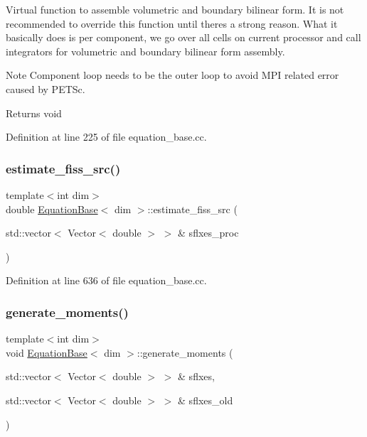 Virtual function to assemble volumetric and boundary bilinear form. It is not recommended to override this function until there\textquotesingle{}s a strong reason. What it basically does is per component, we go over all cells on current processor and call integrators for volumetric and boundary bilinear form assembly.

\begin{DoxyNote}{Note}
Component loop needs to be the outer loop to avoid M\+PI related error caused by P\+E\+T\+Sc.
\end{DoxyNote}
\begin{DoxyReturn}{Returns}
void 
\end{DoxyReturn}


Definition at line 225 of file equation\+\_\+base.\+cc.

\mbox{\label{class_equation_base_a1f36aebd8d54a082db3b2d2a621e67d6}} 
\subsubsection{\texorpdfstring{estimate\+\_\+fiss\+\_\+src()}{estimate\_fiss\_src()}}
{\footnotesize\ttfamily template$<$int dim$>$ \\
double \hyperlink{class_equation_base}{Equation\+Base}$<$ dim $>$\+::estimate\+\_\+fiss\+\_\+src (\begin{DoxyParamCaption}\item[{std\+::vector$<$ Vector$<$ double $>$ $>$ \&}]{sflxes\+\_\+proc }\end{DoxyParamCaption})}



Definition at line 636 of file equation\+\_\+base.\+cc.

\mbox{\label{class_equation_base_aa6ea21eec0c4e3e1dbb17da25b0633d3}} 
\subsubsection{\texorpdfstring{generate\+\_\+moments()}{generate\_moments()}\hspace{0.1cm}{\footnotesize\ttfamily [1/3]}}
{\footnotesize\ttfamily template$<$int dim$>$ \\
void \hyperlink{class_equation_base}{Equation\+Base}$<$ dim $>$\+::generate\+\_\+moments (\begin{DoxyParamCaption}\item[{std\+::vector$<$ Vector$<$ double $>$ $>$ \&}]{sflxes,  }\item[{std\+::vector$<$ Vector$<$ double $>$ $>$ \&}]{sflxes\+\_\+old }\end{DoxyParamCaption})\hspace{0.3cm}{\ttfamily [virtual]}}




